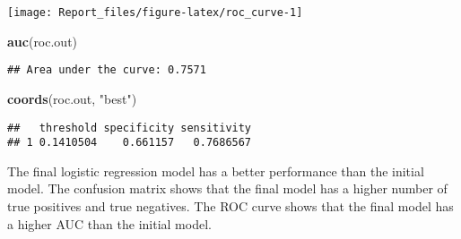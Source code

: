 \documentclass[
]{article}
\newenvironment{Shaded}{\begin{snugshade}}{\end{snugshade}}
\newcommand{\FunctionTok}[1]{\textcolor[rgb]{0.13,0.29,0.53}{\textbf{#1}}}
\newcommand{\NormalTok}[1]{#1}
\newcommand{\StringTok}[1]{\textcolor[rgb]{0.31,0.60,0.02}{#1}}
\begin{document}
\begin{center}\texttt{[image: Report\_files/figure-latex/roc\_curve-1]} \end{center}

\begin{Shaded}
\begin{Highlighting}[]
\FunctionTok{auc}\NormalTok{(roc.out)}
\end{Highlighting}
\end{Shaded}

\begin{verbatim}
## Area under the curve: 0.7571
\end{verbatim}

\begin{Shaded}
\begin{Highlighting}[]
\FunctionTok{coords}\NormalTok{(roc.out, }\StringTok{"best"}\NormalTok{)}
\end{Highlighting}
\end{Shaded}

\begin{verbatim}
##   threshold specificity sensitivity
## 1 0.1410504    0.661157   0.7686567
\end{verbatim}

The final logistic regression model has a better performance than the
initial model. The confusion matrix shows that the final model has a
higher number of true positives and true negatives. The ROC curve shows
that the final model has a higher AUC than the initial model.
\end{document}
